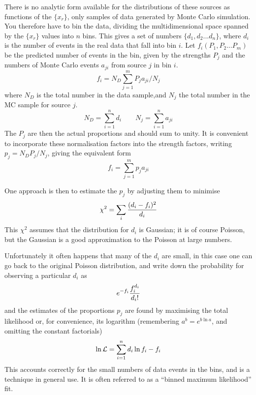 \begin{changebar}
There is no analytic form available for the
distributions of these sources as  functions
of the $\{x_r\}$, only samples of data
generated by Monte Carlo simulation.
You therefore have to bin the data, dividing the
multidimensional
space spanned by the $\{x_r\}$
values into $n$ bins.    This gives
a set of numbers $\{d_1,d_2...d_n\}$, where $d_i$ is the number
of events in the real data that fall into
bin $i$.   Let $f_i(P_1,P_2...P_m)$ be
the predicted number of events in the bin, given
by the strengths $P_j$ and the numbers  of
Monte Carlo events $a_{ji}$ from source $j$ in bin $i$.
\begin{equation}
f_i = N_D \sum_{j=1}^m P_j a_{ji}/N_j \label{mcmixone}
\end{equation}
where $N_D$ is the total number in the data sample,and $N_j$
the total number in the MC sample for source $j$.
\begin{equation}
N_D= \sum_{i=1}^n d_i\qquad N_j=\sum_{i=1}^n a_{ji} \label{totals}
\end{equation}
The $P_j$ are then the actual proportions and should sum to unity.
It is convenient to
incorporate these normalisation factors into the
strength factors, writing $p_j=N_D P_j/N_j$, giving
the equivalent form
\begin{equation}
f_i = \sum_{j=1}^m p_j a_{ji} \label{mcmixtwo}
\end{equation}
 
One approach is then to
estimate the $p_j$ by adjusting them to minimise
\begin{equation}
\chi^2 = \sum_i
{(d_i-f_i)^2 \over d_i } \label{chisq}
\end{equation}
This $\chi^2$ assumes that
the distribution for $d_i$ is Gaussian; it is of course Poisson,
but the Gaussian is a good approximation to the Poisson at large numbers.
 
Unfortunately it often happens that many of the $d_i$ are small, in this
case one can go back to the original Poisson distribution, and write down
the probability for observing a particular $d_i$ as
\begin{equation}
e^{-f_i} {f_i^{d_i}\over d_i!} \label{poisson}
\end{equation}
and the estimates of the proportions
$p_j$ are found by maximising the
total likelihood or, for convenience, its logarithm
(remembering $a^b = e^{b \ln a}$, and omitting the constant factorials)
\begin{equation}
\ln {\cal L} = \sum_{i=1}^n d_i \ln f_i - f_i \label{mlone}
\end{equation}
This accounts correctly for the small numbers of data events in the bins,
and is a technique in general use.  It is often referred to
as a ``binned maximum likelihood'' fit.
 

\end{changebar}
